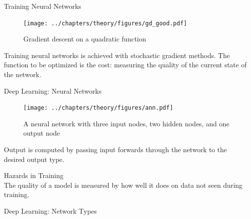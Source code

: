 \documentclass[notes]{beamer}
\begin{document}
\begin{frame}[t]{Training Neural Networks}
	\begin{figure}[h]
		\centering
		\texttt{[image: ../chapters/theory/figures/gd\_good.pdf]}
		\caption{Gradient descent on a quadratic function}
		\label{fig:gd}
	\end{figure}

	Training neural networks is achieved with stochastic gradient methods.
	The function to be optimized is the cost: measuring the quality of the current state of the network.
\end{frame}

\begin{frame}[t]{Deep Learning: Neural Networks}
	\begin{figure}[h]
		\centering
		\texttt{[image: ../chapters/theory/figures/ann.pdf]}
		\caption{A neural network with three input nodes, two hidden nodes, and one output node}
		\label{fig:ann}
	\end{figure}
	Output is computed by passing input forwards through the network to the desired output type.
\end{frame}

\begin{frame}[t]{Hazards in Training}
	\centering
	\\
	The quality of a model is measured by how well it does on data not seen during training.
\end{frame}

\begin{frame}[t]{Deep Learning: Network Types}
	\begin{figure}[h]
		\centering
	\end{figure}
\end{frame}
\end{document}
